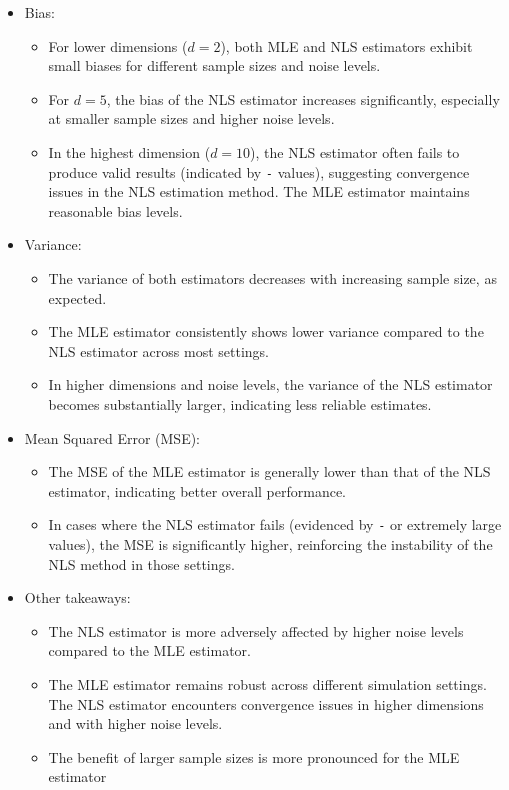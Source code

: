 \documentclass{article}
\begin{document}
\begin{itemize}
    \item Bias:
    \begin{itemize}
        \item For lower dimensions (\( d = 2 \)), both MLE and NLS estimators exhibit small biases for different sample sizes and noise levels.
        \item For \( d = 5 \), the bias of the NLS estimator increases significantly, especially at smaller sample sizes and higher noise levels.
        \item In the highest dimension (\( d = 10 \)), the NLS estimator often fails to produce valid results (indicated by \texttt{-} values), suggesting convergence issues in the NLS estimation method. The MLE estimator maintains reasonable bias levels.
    \end{itemize}
    \item Variance:
    \begin{itemize}
        \item The variance of both estimators decreases with increasing sample size, as expected.
        \item The MLE estimator consistently shows lower variance compared to the NLS estimator across most settings.
        \item In higher dimensions and noise levels, the variance of the NLS estimator becomes substantially larger, indicating less reliable estimates.
    \end{itemize}
    \item Mean Squared Error (MSE):
    \begin{itemize}
        \item The MSE of the MLE estimator is generally lower than that of the NLS estimator, indicating better overall performance.
        \item In cases where the NLS estimator fails (evidenced by \texttt{-} or extremely large values), the MSE is significantly higher, reinforcing the instability of the NLS method in those settings.
    \end{itemize}
    \item Other takeaways:
    \begin{itemize}
      \item The NLS estimator is more adversely affected by higher noise levels compared to the MLE estimator.
      \item The MLE estimator remains robust across different simulation settings. The NLS estimator encounters convergence issues in higher dimensions and with higher noise levels.
      \item The benefit of larger sample sizes is more pronounced for the MLE estimator
    \end{itemize}
\end{itemize}
\end{document}
